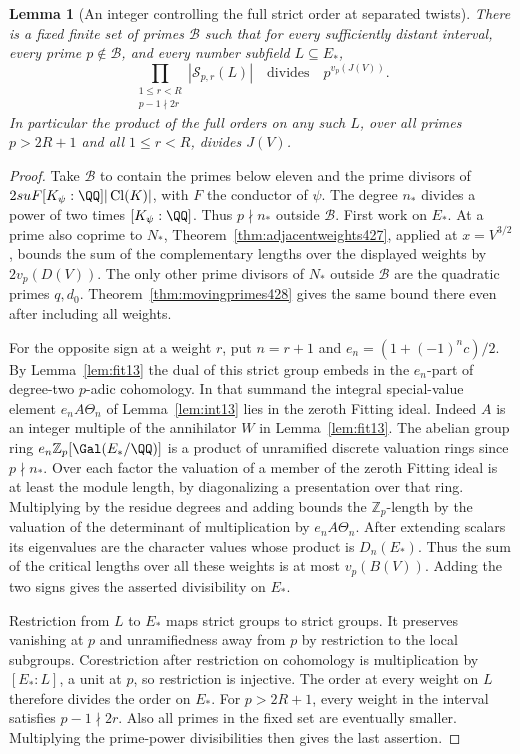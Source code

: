 \documentclass[a4paper,11pt]{article}
\newtheorem{lemma}[proposition]{Lemma}
\theoremstyle{definition}
\theoremstyle{remark}
\newcommand{\ZZ}{\mathbb Z}\newcommand{\ord}{\operatorname{ord}}
\numberwithin{equation}{section}
\newcommand{\Cl}{\operatorname{Cl}}
\begin{document}
\begin{lemma}[An integer controlling the full strict order at separated twists]
\leavevmode\label{lem:fullinteger517}
There is a fixed finite set of primes \(\mathcal B\) such that
for every sufficiently distant interval, every prime
\(p\notin\mathcal B\), and every number subfield \(L\subseteq E_*\),
\[
 \prod_{\substack{1\le r<R\\p-1\nmid 2r}}
       |\mathcal S_{p,r}(L)|\quad\text{divides}\quad p^{v_p(J(V))}.
\]
In particular the product of the full orders on any such \(L\),
over all primes \(p>2R+1\) and all \(1\le r<R\), divides \(J(V)\).
\end{lemma}
\begin{proof}
Take \(\mathcal B\) to contain the primes below eleven and the
prime divisors of \(2suF[K_\psi:\QQ]|\Cl(K)|\), with \(F\) the
conductor of \(\psi\). The degree \(n_*\) divides a power of
two times \([K_\psi:\QQ]\). Thus \(p\nmid n_*\) outside
\(\mathcal B\). First work on \(E_*\). At a prime also coprime
to \(N_*\), Theorem~\ref{thm:adjacentweights427}, applied at
\(x=V^{3/2}\), bounds the sum of the complementary lengths over
the displayed weights by \(2v_p(D(V))\). The only other prime
divisors of \(N_*\) outside \(\mathcal B\) are the quadratic
primes \(q,d_0\). Theorem~\ref{thm:movingprimes428} gives the
same bound there even after including all weights.

For the opposite sign at a weight \(r\), put \(n=r+1\) and
\(e_n=(1+(-1)^nc)/2\). By Lemma~\ref{lem:fit13} the dual of
this strict group embeds in the \(e_n\)-part of degree-two
\(p\)-adic cohomology. In that summand the integral special-value
element \(e_n A\Theta_n\) of Lemma~\ref{lem:int13} lies in the
zeroth Fitting ideal. Indeed \(A\) is an integer multiple of
the annihilator \(W\) in Lemma~\ref{lem:fit13}. The abelian
group ring \(e_n\ZZ_p[\Gal(E_*/\QQ)]\) is a product of
unramified discrete valuation rings since \(p\nmid n_*\).
Over each factor the valuation of a member of the zeroth
Fitting ideal is at least the module length, by diagonalizing
a presentation over that ring. Multiplying by the residue
degrees and adding bounds the \(\ZZ_p\)-length by the valuation
of the determinant of multiplication by \(e_n A\Theta_n\).
After extending scalars its eigenvalues are the character
values whose product is \(D_n(E_*)\). Thus the sum of the
critical lengths over all these weights is at most \(v_p(B(V))\).
Adding the two signs gives the asserted divisibility on \(E_*\).

Restriction from \(L\) to \(E_*\) maps strict groups to strict
groups. It preserves vanishing at \(p\) and unramifiedness away
from \(p\) by restriction to the local subgroups. Corestriction
after restriction on cohomology is multiplication by
\([E_*:L]\), a unit at \(p\), so restriction is injective.
The order at every weight on \(L\) therefore divides the order
on \(E_*\). For \(p>2R+1\), every weight in the interval satisfies
\(p-1\nmid 2r\). Also all primes in the fixed set are eventually
smaller. Multiplying the prime-power divisibilities then gives
the last assertion.
\end{proof}
\end{document}
